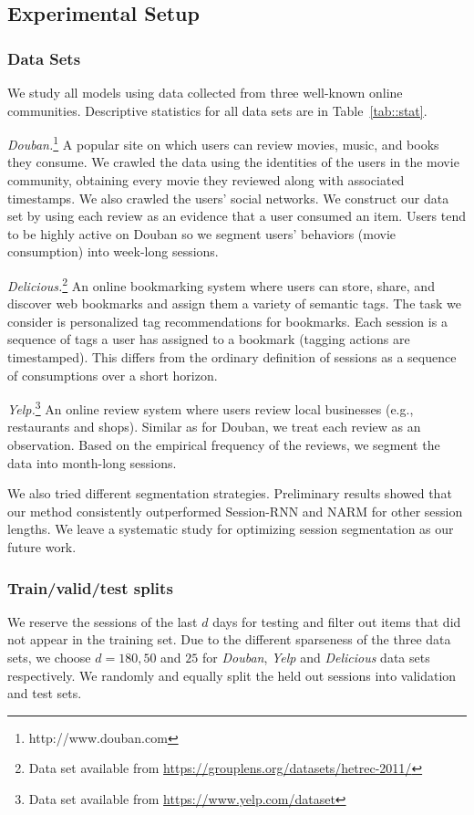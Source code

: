 \documentclass[sigconf]{acmart}
\begin{document}
\subsection{Experimental Setup}
\subsubsection{Data Sets}
We study all models using data collected from three well-known online communities. Descriptive statistics for all data sets are in Table~\ref{tab::stat}.

\textit{Douban.}\footnote{http://www.douban.com} A popular site on which users can review movies, music, and books they consume. We crawled the data using the identities of the users in the movie community, obtaining every movie they reviewed along with associated timestamps. We also crawled the users' social networks. We construct our data set by using each review as an evidence that a user consumed an item. Users tend to be highly active on Douban so we segment users' behaviors (movie consumption) into week-long sessions.

\textit{Delicious.}\footnote{Data set available from {\url{https://grouplens.org/datasets/hetrec-2011/}}} An online bookmarking system where users can store, share, and discover web bookmarks and assign them a variety of semantic tags. The task we consider is personalized tag recommendations for bookmarks. Each session is a sequence of tags a user has assigned to a bookmark (tagging actions are timestamped). This differs from the ordinary definition of sessions as a sequence of consumptions over a short horizon.


\textit{Yelp.}\footnote{Data set available from {\url{https://www.yelp.com/dataset}}}
An online review system where users review local businesses (e.g., restaurants and shops). Similar as for Douban, we treat each review as an observation. Based on the empirical frequency of the reviews, we segment the data into month-long sessions.

We also tried different segmentation strategies. Preliminary results showed that our method consistently outperformed Session-RNN and NARM for other session lengths. We leave a systematic study for optimizing session segmentation as our future work.

\subsubsection{Train/valid/test splits} We reserve the sessions of the last $d$ days for testing and filter out items that did not appear in the training set. Due to the different sparseness of the three data sets, we choose $d = 180, 50$ and $25$ for \textit{Douban}, \textit{Yelp} and \textit{Delicious} data sets respectively. We randomly and equally split the held out sessions into validation and test sets.
\end{document}
